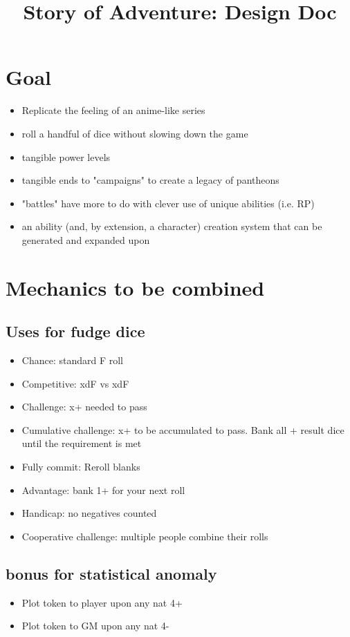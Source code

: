 \documentclass[10pt,letterpaper]{article}
\title{Story of Adventure: Design Doc}
\begin{document}
	
	\section{Goal}
	\begin{itemize}
		\item  Replicate the feeling of an anime-like series 
		\item  roll a handful of dice without slowing down the game 
		\item  tangible power levels 
		\item  tangible ends to "campaigns" to create a legacy of pantheons
		\item  "battles" have more to do with clever use of unique abilities (i.e. RP)
		\item  an ability (and, by extension, a character) creation system that can be generated and expanded upon
	\end{itemize}
	
	
	\section{Mechanics to be combined}
	
	\subsection{Uses for fudge dice}
	\begin{itemize}
		\item  Chance: standard F roll
		\item  Competitive: xdF vs xdF
		\item  Challenge: x+ needed to pass
		\item  Cumulative challenge: x+ to be accumulated to pass. Bank all + result dice until the requirement is met
		\item  Fully commit: Reroll blanks
		\item  Advantage: bank 1+ for your next roll
		\item  Handicap: no negatives counted
		\item  Cooperative challenge: multiple people combine their rolls 
	\end{itemize}
	\subsection{bonus for statistical anomaly}
	\begin{itemize}
		\item  Plot token to player upon any nat 4+
		\item  Plot token to GM upon any nat 4-
	\end{itemize}
\end{document}
